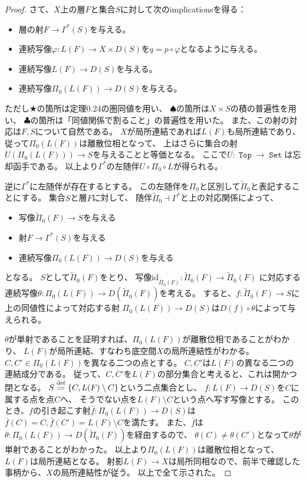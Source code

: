 \documentclass[uplatex]{jsarticle}
\theoremstyle{definition}
\def\id{\mathrm{id}}
\newcommand{\dfn}{\overset{\mathrm{\tiny def}}{\coloneqq}}
\DeclareMathOperator{\sfSet}{\mathtt{Set}}
\DeclareMathOperator{\sfTop}{\mathtt{Top}}
\begin{document}
\begin{proof}
  さて、\(X\)上の層\(F\)と集合\(S\)に対して次のimplicationsを得る：
  \begin{itemize}
    \item[ \ ]
    層の射\(F\to \Gamma^*(S)\)を与える。
    \item[\(\overset{\bigstar}{\Leftrightarrow}\)]
    連続写像\(\varphi: L(F) \to X\times D(S)\)を\(q=p\circ \varphi\)となるように与える。
    \item[\(\overset{\spadesuit}{\Leftrightarrow}\)]
    連続写像\(L(F)\to D(S)\)を与える。
    \item[\(\overset{\clubsuit}{\Leftrightarrow}\)]
    連続写像\(\Pi_0(L(F))\to D(S)\)を与える。
  \end{itemize}
  ただし\(\bigstar\)の箇所は定理0.24の圏同値を用い、
  \(\spadesuit\)の箇所は\(X\times S\)の積の普遍性を用い、
  \(\clubsuit\)の箇所は「同値関係で割ること」の普遍性を用いた。
  また、この射の対応は\(F,S\)について自然である。
  \(X\)が局所連結であれば\(L(F)\)も局所連結であり、
  従って\(\Pi_0(L(F))\)は離散位相となって、
  上はさらに集合の射\(U(\Pi_0(L(F)))\to S\)を与えることと等価となる。
  ここで\(U:\sfTop\to \sfSet\)は忘却函手である。
  以上より\(\Gamma^*\)の左随伴\(U\circ \Pi_0\circ L\)が得られる。

  逆に\(\Gamma^*\)に左随伴が存在するとする。
  この左随伴を\(\Pi_0\)と区別して\(\tilde{\Pi}_0\)と表記することにする。
  集合\(S\)と層\(F\)に対して、
  随伴\(\tilde{\Pi}_0\dashv \Gamma^*\)と上の対応関係によって、
  \begin{itemize}
    \item[ \ ] 写像\(\tilde{\Pi}_0(F)\to S\)を与える
    \item[\(\Leftrightarrow\)] 射\(F\to \Gamma^*(S)\)を与える
    \item[\(\Leftrightarrow\)] 連続写像\(\Pi_0(L(F))\to D(S)\)を与える
  \end{itemize}
  となる。
  \(S\)として\(\tilde{\Pi}_0(F)\)をとり、
  写像\(\id_{\tilde{\Pi}_0(F)}:\tilde{\Pi}_0(F)\to \tilde{\Pi}_0(F)\)
  に対応する連続写像\(\theta:\Pi_0(L(F))\to D(\tilde{\Pi}_0(F))\)を考える。
  すると、\(f:\tilde{\Pi}_0(F)\to S\)に上の同値性によって対応する射
  \(\Pi_0(L(F))\to D(S)\)は\(D(f)\circ \theta\)によって与えられる。

  \(\theta\)が単射であることを証明すれば、\(\Pi_0(L(F))\)が離散位相であることがわかり、
  \(L(F)\)が局所連結、すなわち底空間\(X\)の局所連結性がわかる。
  \(C,C'\in \Pi_0(L(F))\)を異なる二つの点とする。
  \(C,C'\)は\(L(F)\)の異なる二つの連結成分である。
  従って、\(C,C'\)を\(L(F)\)の部分集合と考えると、これは開かつ閉となる。
  \(S \dfn \left\{ C ,L(F)\setminus C\right\}\)という二点集合とし、
  \(f:L(F)\to D(S)\)を\(C\)に属する点を点\(C\)へ、
  そうでない点を\(L(F)\setminus C\)という点へ写す写像とする。
  このとき、\(f\)の引き起こす射\(\bar{f}:\Pi_0(L(F))\to D(S)\)は
  \(\bar{f}(C) = C, \bar{f}(C') = L(F)\setminus C\)を満たす。
  また、\(\bar{f}\)は\(\theta:\Pi_0(L(F))\to D(\tilde{\Pi}_0(F))\)を経由するので、
  \(\theta(C) \neq\theta(C')\)となって\(\theta\)が単射であることがわかった。
  以上より\(\Pi_0(L(F))\)は離散位相となって、
  \(L(F)\)は局所連結となる。
  射影\(L(F)\to X\)は局所同相なので、前半で確認した事柄から、\(X\)の局所連結性が従う。
  以上で全て示された。
\end{proof}
\end{document}
